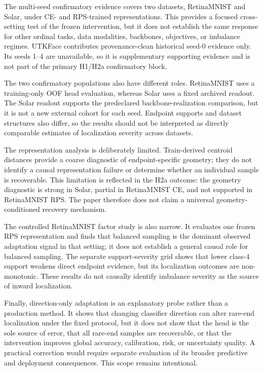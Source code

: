 The multi-seed confirmatory evidence covers two datasets, RetinaMNIST and
Solar, under CE- and RPS-trained representations. This provides a focused
cross-setting test of the frozen intervention, but it does not establish the
same response for other ordinal tasks, data modalities, backbones, objectives,
or imbalance regimes. UTKFace contributes provenance-clean historical seed-0
evidence only. Its seeds 1--4 are unavailable, so it is supplementary
supporting evidence and is not part of the primary H1/H2a confirmatory block.

The two confirmatory populations also have different roles. RetinaMNIST uses a
training-only OOF head evaluation, whereas Solar uses a fixed archived readout.
The Solar readout supports the predeclared backbone-realization comparison, but
it is not a new external cohort for each seed. Endpoint supports and dataset
structures also differ, so the results should not be interpreted as directly
comparable estimates of localization severity across datasets.

The representation analysis is deliberately limited. Train-derived centroid
distances provide a coarse diagnostic of endpoint-specific geometry; they do
not identify a causal representation failure or determine whether an individual
sample is recoverable. This limitation is reflected in the H2a outcome: the
geometry diagnostic is strong in Solar, partial in RetinaMNIST CE, and not
supported in RetinaMNIST RPS. The paper therefore does not claim a universal
geometry-conditioned recovery mechanism.

The controlled RetinaMNIST factor study is also narrow. It evaluates one frozen
RPS representation and finds that balanced sampling is the dominant observed
adaptation signal in that setting; it does not establish a general causal role
for balanced sampling. The separate support-severity grid shows that lower
class-4 support weakens direct endpoint evidence, but its localization outcomes
are non-monotonic. These results do not causally identify imbalance severity as
the source of inward localization.

Finally, direction-only adaptation is an explanatory probe rather than a
production method. It shows that changing classifier direction can alter
rare-end localization under the fixed protocol, but it does not show that the
head is the sole source of error, that all rare-end samples are recoverable, or
that the intervention improves global accuracy, calibration, risk, or
uncertainty quality. A practical correction would require separate evaluation
of its broader predictive and deployment consequences. This scope remains
intentional.
